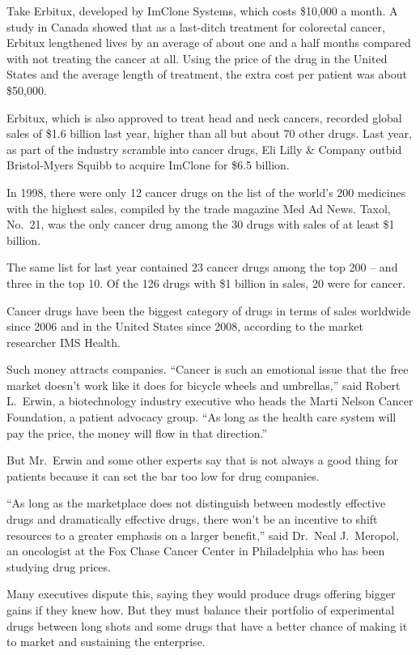 ﻿\documentclass[12pt]{article}
\begin{document}
Take Erbitux, developed by ImClone Systems, which costs \$10,000 a month. A study in Canada showed
that as a last-ditch treatment for colorectal cancer, Erbitux lengthened lives by an average of
about one and a half months compared with not treating the cancer at all. Using the price of the
drug in the United States and the average length of treatment, the extra cost per patient was about
\$50,000.

Erbitux, which is also approved to treat head and neck cancers, recorded global sales of \$1.6
billion last year, higher than all but about 70 other drugs. Last year, as part of the industry
scramble into cancer drugs, Eli Lilly \& Company outbid Bristol-Myers Squibb to acquire ImClone for
\$6.5 billion.

In 1998, there were only 12 cancer drugs on the list of the world's 200 medicines with the highest
sales, compiled by the trade magazine Med Ad News. Taxol, No.~21, was the only cancer drug among the
30 drugs with sales of at least \$1 billion.

The same list for last year contained 23 cancer drugs among the top 200 -- and three in the top 10.
Of the 126 drugs with \$1 billion in sales, 20 were for cancer.

Cancer drugs have been the biggest category of drugs in terms of sales worldwide since 2006 and in
the United States since 2008, according to the market researcher IMS Health.

Such money attracts companies. ``Cancer is such an emotional issue that the free market doesn't work
like it does for bicycle wheels and umbrellas,'' said Robert L.~Erwin, a biotechnology industry
executive who heads the Marti Nelson Cancer Foundation, a patient advocacy group. ``As long as the
health care system will pay the price, the money will flow in that direction.''

But Mr.~Erwin and some other experts say that is not always a good thing for patients because it can
set the bar too low for drug companies.

``As long as the marketplace does not distinguish between modestly effective drugs and dramatically
effective drugs, there won't be an incentive to shift resources to a greater emphasis on a larger
benefit,'' said Dr.~Neal J.~Meropol, an oncologist at the Fox Chase Cancer Center in Philadelphia
who has been studying drug prices.

Many executives dispute this, saying they would produce drugs offering bigger gains if they knew
how. But they must balance their portfolio of experimental drugs between long shots and some drugs
that have a better chance of making it to market and sustaining the enterprise.
\end{document}
